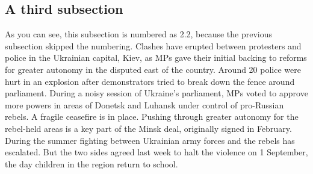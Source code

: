 \documentclass[a4paper,12pt]{article}
\begin{document}
\subsection{A third subsection}
As you can see, this subsection is numbered as 2.2, because the previous subsection skipped the numbering.  Clashes have erupted between protesters and police in the Ukrainian capital, Kiev, as MPs gave their initial backing to reforms for greater autonomy in the disputed east of the country.  Around 20 police were hurt in an explosion after demonstrators tried to break down the fence around parliament.  During a noisy session of Ukraine's parliament, MPs voted to approve more powers in areas of Donetsk and Luhansk under control of pro-Russian rebels.  A fragile ceasefire is in place.  Pushing through greater autonomy for the rebel-held areas is a key part of the Minsk deal, originally signed in February.  During the summer fighting between Ukrainian army forces and the rebels has escalated. But the two sides agreed last week to halt the violence on 1 September, the day children in the region return to school.  
\end{document}
